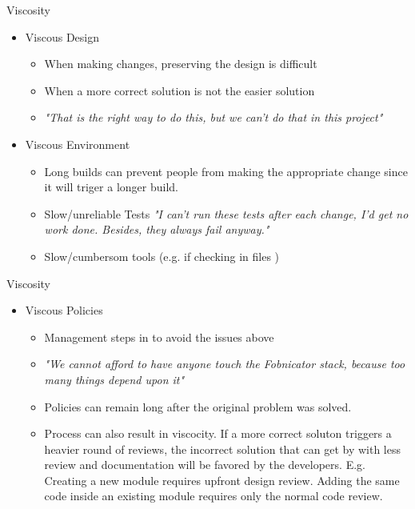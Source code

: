 \documentclass[xcolor=svgnames]{beamer}
\begin{document}
{%
%
\begin{frame}{Viscosity}

    \begin{itemize}
        \item<1->Viscous Design
        \begin{itemize}
            \item<3->When making changes, preserving the design is difficult
            \item<4->When a more correct solution is not the easier solution
            \item<5->\textit{"That is the right way to do this, but we can't do
                that in this project"}
        \end{itemize}
        \item<2->Viscous Environment
        \begin{itemize}
            \item<6->Long builds can prevent people from making the appropriate
                change since it will triger a longer build.
            \item<7->Slow/unreliable Tests \textit{"I can't run these tests
                after each change, I'd get no work done.  Besides, they always
                fail anyway."}
            \item<8->Slow/cumbersom tools (e.g. if checking in files )
        \end{itemize}
    \end{itemize}
\end{frame}
}

{%
%
\begin{frame}{Viscosity}
    \begin{itemize}
        \item Viscous Policies
        \begin{itemize}
            \item<1->Management steps in to avoid the issues above
            \item<2->\textit{"We cannot afford to have anyone touch the
                Fobnicator stack, because too many things depend upon it"}
            \item<3->Policies can remain long after the original problem was
                solved.
            \item<4->Process can also result in viscocity.  If a more correct
                soluton triggers a heavier round of reviews, the incorrect
                solution that can get by with less review and documentation will
                be favored by the developers.  E.g. Creating a new module
                requires upfront design review.  Adding the same code inside an
                existing module requires only the normal code review.
        \end{itemize}
    \end{itemize}
\end{frame}
}
\end{document}
